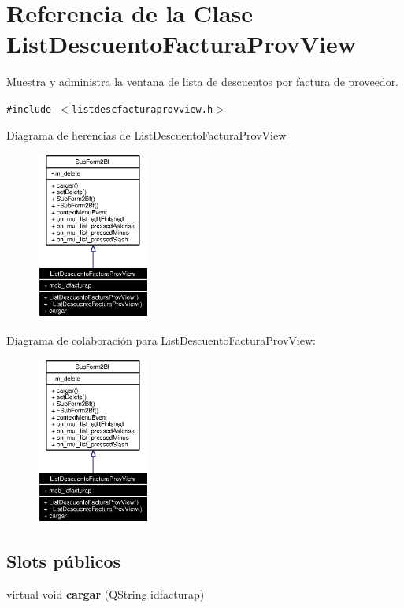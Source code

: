 \section{Referencia de la Clase List\-Descuento\-Factura\-Prov\-View}
\label{classListDescuentoFacturaProvView}
Muestra y administra la ventana de lista de descuentos por factura de proveedor.  


{\tt \#include $<$listdescfacturaprovview.h$>$}

Diagrama de herencias de List\-Descuento\-Factura\-Prov\-View\begin{figure}[H]
\begin{center}
\leavevmode
\includegraphics[width=106pt]{classListDescuentoFacturaProvView__inherit__graph}
\end{center}
\end{figure}
Diagrama de colaboraci\'{o}n para List\-Descuento\-Factura\-Prov\-View:\begin{figure}[H]
\begin{center}
\leavevmode
\includegraphics[width=106pt]{classListDescuentoFacturaProvView__coll__graph}
\end{center}
\end{figure}
\subsection*{Slots p\'{u}blicos}
\begin{CompactItemize}
\item 
virtual void {\bf cargar} (QString idfacturap)\label{classListDescuentoFacturaProvView_i0}

\end{CompactItemize}
